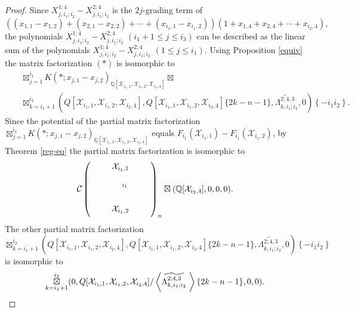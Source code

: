 \documentclass[10pt]{amsart}
\theoremstyle{break}
\begin{document}
\begin{proof}
Since $X_{j,i_1;i_2}^{1;4}-X_{j,i_1;i_2}^{2;4}$ is the $2j$-grading term of
\begin{equation*}
((x_{1,1}-x_{1,2})+(x_{2,1}-x_{2,2})+\cdots +(x_{i_1,1}-x_{i_1,2}))(1+x_{1,4}+x_{2,4}+\cdots +x_{i_2,4}),
\end{equation*}
the polynomials $X_{j,i_1;i_2}^{1;4}-X_{j,i_1;i_2}^{2;4}$ $(i_1+1\le j\le i_3)$ can be described 
as the linear sum of the polynomials $X_{j,i_1;i_2}^{1;4}-X_{j,i_1;i_2}^{2;4}$ $(1\le j\le i_1)$.
Using Proposition \ref{equiv} the matrix factorization $(\ast)$ is isomorphic to
\begin{eqnarray*}
&&\mathop{\boxtimes}_{j=1}^{i_1}K(\ast ;x_{j,1}-x_{j,2})_{{{\mathbb{Q}}}[\mathcal{X}_{i_1,1},\mathcal{X}_{i_1,2},\mathcal{X}_{i_{2},4}]}\boxtimes\\[-0.1em]
&&\mathop{\boxtimes}_{k=i_1+1}^{i_3}
(Q[\mathcal{X}_{i_{1},1},\mathcal{X}_{i_{1},2},\mathcal{X}_{i_{2},4}],Q[\mathcal{X}_{i_{1},1},\mathcal{X}_{i_{1},2},\mathcal{X}_{i_{2},4}]\{2k-n-1\},
\widetilde{\Lambda_{k,i_1;i_2}^{2;4,3}},0)\left\{ -i_1 i_2 \right\}.
\end{eqnarray*}
Since the potential of the partial matrix factorization 
$\displaystyle \mathop{\boxtimes}_{j=1}^{i_1}K(\ast ;x_{j,1}-x_{j,2})_{{{\mathbb{Q}}}[\mathcal{X}_{i_1,1},\mathcal{X}_{i_1,2},\mathcal{X}_{i_{2},4}]}$ equals 
$F_{i_1}(\mathcal{X}_{i_1,1})-F_{i_1}(\mathcal{X}_{i_1,2})$, 
by Theorem \ref{reg-eq} the partial matrix factorization is isomorphic to
\begin{equation*}
{{\mathcal{C}}}\acute{}\left( 
\unitlength 0.1in
\begin{picture}(  10.00,  5.0000)(  -2.000,-7.0000)
\special{pn 8}\special{pa 300 900}\special{pa 300 400}\special{fp}\special{sh 1}\special{pa 300 400}\special{pa 280 468}\special{pa 300 454}\special{pa 320 468}\special{pa 300 400}\special{fp}\put(3.750000,-6.0000){\makebox(0,0){${}_{i_1}$}}\put(3.0000,-10.0000){\makebox(0,0){$\mathcal{X}_{i_1,2}$}}\put(3.0000,-3.0000){\makebox(0,0){$\mathcal{X}_{i_1,1}$}}\end{picture}
\right)_n\boxtimes ({{\mathbb{Q}}}[\mathcal{X}_{i_2,4}],0,0,0).
\end{equation*} 
The other partial matrix factorization $\mathop{\boxtimes}_{k=i_1+1}^{i_3}
(Q[\mathcal{X}_{i_{1},1},\mathcal{X}_{i_{1},2},\mathcal{X}_{i_{2},4}],Q[\mathcal{X}_{i_{1},1},\mathcal{X}_{i_{1},2},\mathcal{X}_{i_{2},4}]\{2k-n-1\},
\widetilde{\Lambda_{k,i_1;i_2}^{2;4,3}},0)\left\{ -i_1 i_2 \right\}$ is isomorphic to
\begin{equation*}
\mathop{\boxtimes}_{k=i_1+1}^{i_3}(0,Q[\mathcal{X}_{i_{1},1},\mathcal{X}_{i_{1},2},\mathcal{X}_{i_{2},4}]/\left< \widetilde{\Lambda_{k,i_1;i_2}^{2;4,3}}\hspace{1mm}\right>\{2k-n-1\},0,0).

\end{equation*}
\end{proof}
\end{document}
